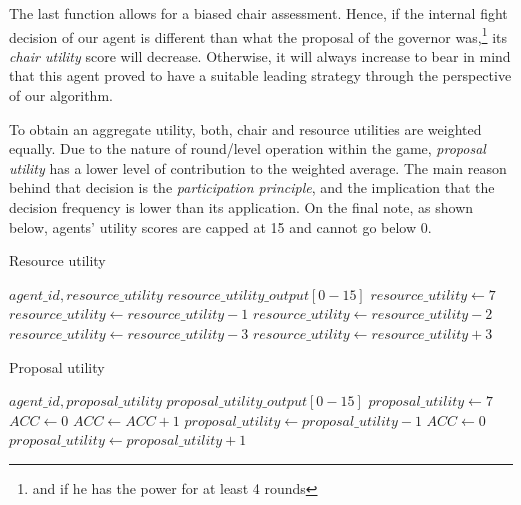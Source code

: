         The last function allows for a biased chair assessment. Hence, if the internal fight decision of our agent is different than what the proposal of the governor was,\footnote{and if he has the power for at least 4 rounds} its \textit{chair utility }score will decrease. Otherwise, it will always increase to bear in mind that this agent proved to have a suitable leading strategy through the perspective of our algorithm.
        
        To obtain an aggregate utility, both, chair and resource utilities are weighted equally. Due to the nature of round/level operation within the game, \textit{proposal utility} has a lower level of contribution to the weighted average. The main reason behind that decision is the \textit{participation principle}, and the implication that the decision frequency is lower than its application. On the final note, as shown below, agents' utility scores are capped at 15 and cannot go below 0.



\begin{algorithm}
\caption{Resource utility}
\begin{algorithmic} 
\Require $agent\_id, resource\_utility$
\Ensure $resource\_utility\_output[0-15]$
\State $resource\_utility \leftarrow 7$
\EndIf
{}
\State $resource\_utility \leftarrow resource\_utility-1$
\EndIf
{}
\State $resource\_utility \leftarrow resource\_utility-2$
\Else
\State $resource\_utility \leftarrow resource\_utility-3$
\EndIf
\EndIf
{}
\State $resource\_utility \leftarrow resource\_utility+3$
\EndIf
\end{algorithmic}
\end{algorithm}


\begin{algorithm}
\caption{Proposal utility}
\begin{algorithmic} 
\Require $agent\_id, proposal\_utility$
\Ensure $proposal\_utility\_output[0-15]$
\State $proposal\_utility \leftarrow 7$
\State $ACC \leftarrow 0$
\EndIf
{}
\State $ACC \leftarrow ACC+1$
\State $proposal\_utility \leftarrow proposal\_utility - 1$
\State $ACC \leftarrow 0$
\EndIf
\EndIf
{}
\State $proposal\_utility \leftarrow proposal\_utility + 1$
\EndIf
\end{algorithmic}
\end{algorithm}

